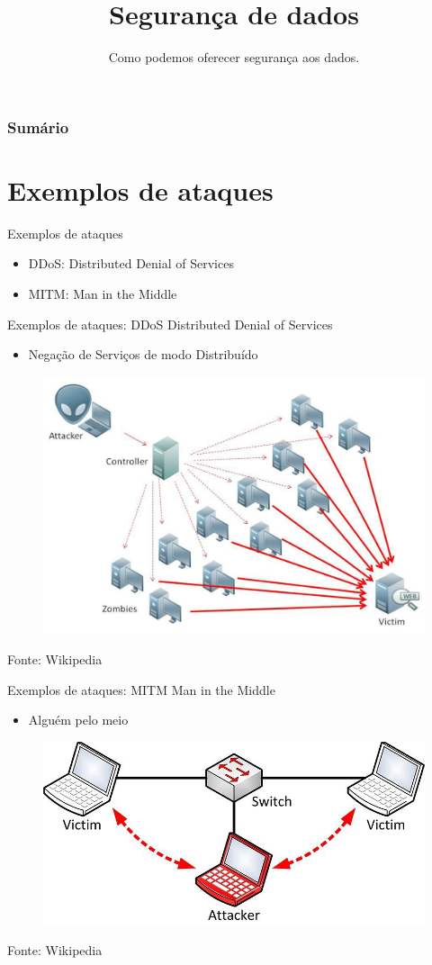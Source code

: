 \documentclass[t]{beamer}
\title{Segurança de dados}
\subtitle{Como podemos oferecer segurança aos dados.}
\begin{document}
\frame{\titlepage}

\begin{frame}
\frametitle{Sumário}
\tableofcontents
\end{frame}

\section{Exemplos de ataques}

\begin{frame}{Exemplos de ataques}
	\begin{itemize}	
		\item DDoS: Distributed Denial of Services
		\item MITM: Man in the Middle
	\end{itemize}
\end{frame}

\begin{frame}{Exemplos de ataques: DDoS}
	Distributed Denial of Services
	\begin{itemize}	
		\item Negação de Serviços de modo Distribuído
	\end{itemize}

\begin{figure}
	\centering
	\includegraphics[width=0.7\linewidth]{ddos-attack-ex}
	\label{fig:ddos-attack-ex}
\end{figure}
\center \tiny Fonte: Wikipedia

\end{frame}

\begin{frame}{Exemplos de ataques: MITM}
	Man in the Middle
	\begin{itemize}	
		\item Alguém pelo meio
	\end{itemize}
	
	\begin{figure}
		\centering
		\includegraphics[width=0.7\linewidth]{mitm}
		\label{fig:mitm-attack-ex}
	\end{figure}
	\center \tiny Fonte: Wikipedia
	
\end{frame}
\end{document}
